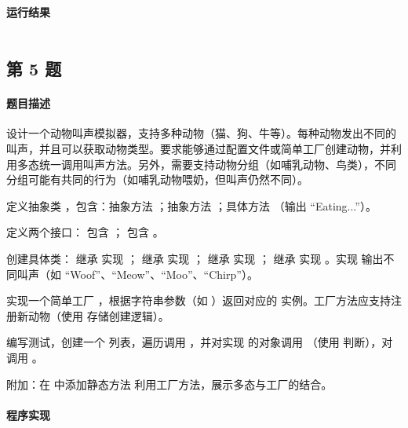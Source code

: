 \documentclass{academics}
\begin{document}
\paragraph{运行结果} {
    \inputminted{text}{../res/P04.out}
}

\subsection{第 5 题}

\paragraph{题目描述} {
    设计一个动物叫声模拟器，支持多种动物（猫、狗、牛等）。每种动物发出不同的叫声，并且可以获取动物类型。要求能够通过配置文件或简单工厂创建动物，并利用多态统一调用叫声方法。另外，需要支持动物分组（如哺乳动物、鸟类），不同分组可能有共同的行为（如哺乳动物喂奶，但叫声仍然不同）。

    定义抽象类 ，包含：抽象方法 ；抽象方法 ；具体方法 （输出 ``Eating...''）。

    定义两个接口： 包含 ； 包含 。

    创建具体类： 继承  实现 ； 继承  实现 ； 继承  实现 ； 继承  实现 。实现  输出不同叫声（如 ``Woof''、``Meow''、``Moo''、``Chirp''）。

    实现一个简单工厂 ，根据字符串参数（如 ）返回对应的  实例。工厂方法应支持注册新动物（使用  存储创建逻辑）。

    编写测试，创建一个  列表，遍历调用 ，并对实现  的对象调用 （使用  判断），对  调用 。

    附加：在  中添加静态方法  利用工厂方法，展示多态与工厂的结合。
}

\paragraph{程序实现} {
    \inputminted[label=Animal.java]{java}{../src/P05/Animal.java}
    \inputminted[label=Mammal.java]{java}{../src/P05/Mammal.java}
    \inputminted[label=Bird.java]{java}{../src/P05/Bird.java}
    \inputminted[label=Dog.java]{java}{../src/P05/Dog.java}
    \inputminted[label=Cat.java]{java}{../src/P05/Cat.java}
    \inputminted[label=Cow.java]{java}{../src/P05/Cow.java}
    \inputminted[label=Sparrow.java]{java}{../src/P05/Sparrow.java}
    \inputminted[label=AnimalFactory.java]{java}{../src/P05/AnimalFactory.java}
    \inputminted[label=AnimalSimulator.java]{java}{../src/P05/AnimalSimulator.java}
}
\end{document}
